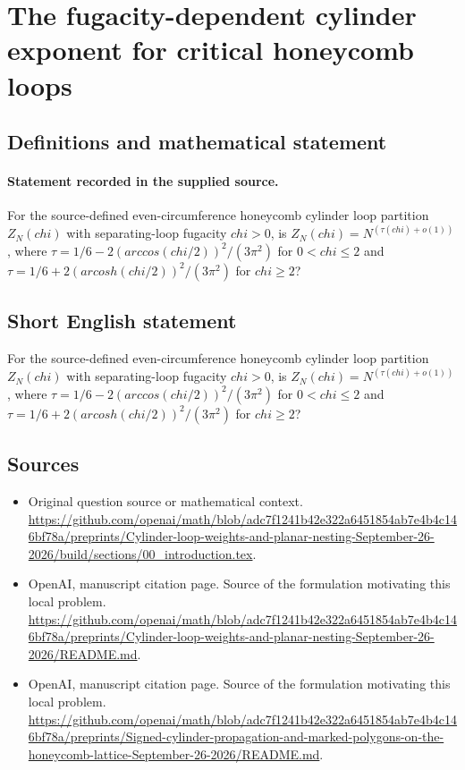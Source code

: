 \documentclass[11pt]{article}
\begin{document}
\section*{The fugacity-dependent cylinder exponent for critical honeycomb loops}\label{30007367}
\subsection{Definitions and mathematical statement}
\paragraph{Statement recorded in the supplied source.}
For the source-defined even-circumference honeycomb cylinder loop partition $Z_N(chi)$ with separating-loop fugacity $chi>0$, is $Z_N(chi)=N^(\tau (chi)+o(1))$, where $\tau =1/6-2(arccos(chi/2))^2/(3\pi ^2)$ for $0<chi\leq 2$ and $\tau =1/6+2(arcosh(chi/2))^2/(3\pi ^2)$ for $chi\geq 2$?
\subsection{Short English statement}
For the source-defined even-circumference honeycomb cylinder loop partition $Z_N(chi)$ with separating-loop fugacity $chi>0$, is $Z_N(chi)=N^(\tau (chi)+o(1))$, where $\tau =1/6-2(arccos(chi/2))^2/(3\pi ^2)$ for $0<chi\leq 2$ and $\tau =1/6+2(arcosh(chi/2))^2/(3\pi ^2)$ for $chi\geq 2$?
\subsection{Sources}
\begin{itemize}
\item[S1] Original question source or mathematical context.
\url{https://github.com/openai/math/blob/adc7f1241b42e322a6451854ab7e4b4c146bf78a/preprints/Cylinder-loop-weights-and-planar-nesting-September-26-2026/build/sections/00_introduction.tex}.
\item[S2] OpenAI, manuscript citation page. Source of the formulation motivating this local problem.
\url{https://github.com/openai/math/blob/adc7f1241b42e322a6451854ab7e4b4c146bf78a/preprints/Cylinder-loop-weights-and-planar-nesting-September-26-2026/README.md}.
\item[S3] OpenAI, manuscript citation page. Source of the formulation motivating this local problem.
\url{https://github.com/openai/math/blob/adc7f1241b42e322a6451854ab7e4b4c146bf78a/preprints/Signed-cylinder-propagation-and-marked-polygons-on-the-honeycomb-lattice-September-26-2026/README.md}.
\end{itemize}
\end{document}

